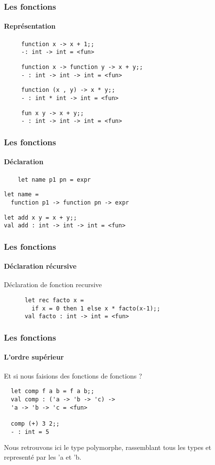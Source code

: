 \begin{frame}[fragile]
	\frametitle{Les fonctions}
	\framesubtitle{Représentation}
	\begin{center}
		\begin{minipage}{10cm}
				\begin{lstlisting}
     function x -> x + 1;;
     -: int -> int = <fun>
				\end{lstlisting}
				\begin{lstlisting}
     function x -> function y -> x + y;;
     - : int -> int -> int = <fun>
				\end{lstlisting}
				\begin{lstlisting}
     function (x , y) -> x * y;;
     - : int * int -> int = <fun>
				\end{lstlisting}
				\begin{lstlisting}
     fun x y -> x + y;;
     - : int -> int -> int = <fun>
				\end{lstlisting}
		\end{minipage}
  \end{center}
\end{frame}

\begin{frame}[fragile]
	\frametitle{Les fonctions}
  	\framesubtitle{Déclaration}
    	\begin{lstlisting}
	let name p1 pn = expr
    	\end{lstlisting}
	\begin{lstlisting}
let name = 
  function p1 -> function pn -> expr
  	\end{lstlisting}
  	\vspace{0.4cm}
  	\begin{lstlisting}
let add x y = x + y;;
val add : int -> int -> int = <fun>
  	\end{lstlisting}
\end{frame}

\begin{frame}[fragile]
	\frametitle{Les fonctions}
	\framesubtitle{Déclaration récursive}
	\begin{block}{Déclaration de fonction recursive} 
	  \begin{lstlisting}
	  let rec facto x = 
	  	if x = 0 then 1 else x * facto(x-1);;
	  val facto : int -> int = <fun>
	  \end{lstlisting}
	\end{block}
\end{frame}

\begin{frame}[fragile]
	\frametitle{Les fonctions}
  	\framesubtitle{L'ordre supérieur}
  	Et si nous faisions des fonctions de fonctions ? 
 	\begin{lstlisting}
  let comp f a b = f a b;;
  val comp : ('a -> 'b -> 'c) -> 
  'a -> 'b -> 'c = <fun>
  
  comp (+) 3 2;;
  - : int = 5
 	\end{lstlisting}
	Nous retrouvons ici le type polymorphe, rassemblant tous les types et\\
        representé par les 'a et 'b.
\end{frame}

